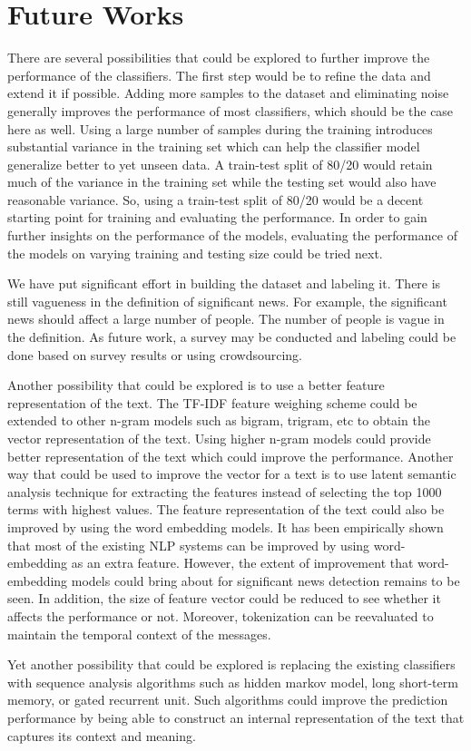 \section{Future Works}
There are several possibilities that could be explored to further improve the performance of the classifiers. The first step would be to refine the data and extend it if possible. Adding more samples to the dataset and eliminating noise generally improves the performance of most classifiers, which should be the case here as well. Using a large number of samples during the training introduces substantial variance in the training set which can help the classifier model generalize better to yet unseen data. A train-test split of 80/20 would retain much of the variance in the training set while the testing set would also have reasonable variance. So, using a train-test split of 80/20 would be a decent starting point for training and evaluating the performance. In order to gain further insights on the performance of the models, evaluating the performance of the models on varying training and testing size could be tried next.

We have put significant effort in building the dataset and labeling it. There is still vagueness in the definition of significant news. For example, the significant news should affect a large number of people. The number of people is vague in the definition. As future work, a survey may be conducted and labeling could be done based on survey results or using crowdsourcing. 

Another possibility that could be explored is to use a better feature representation of the text. The TF-IDF feature weighing scheme could be extended to other n-gram models such as bigram, trigram, etc to obtain the vector representation of the text. Using higher n-gram models could provide better representation of the text which could improve the performance. Another way that could be used to improve the vector for a text is to use latent semantic analysis\cite{dumais2004latent} technique for extracting the features instead of selecting the top 1000 terms with highest values. The feature representation of the text could also be improved by using the word embedding models. It has been empirically shown that most of the existing NLP systems can be improved by using word-embedding as an extra feature\cite{turian2010word}. However, the extent of improvement that word-embedding models could bring about for significant news detection remains to be seen. In addition, the size of feature vector could be reduced to see whether it affects the performance or not. Moreover, tokenization can be reevaluated to maintain the temporal context of the messages. 

Yet another possibility that could be explored is replacing the existing classifiers with sequence analysis algorithms such as hidden markov model\cite{baum1966statistical}, long short-term memory\cite{hochreiter1997long}, or gated recurrent unit\cite{cho2014learning}. Such algorithms could improve the prediction performance by being able to construct an internal representation of the text that captures its context and meaning.
